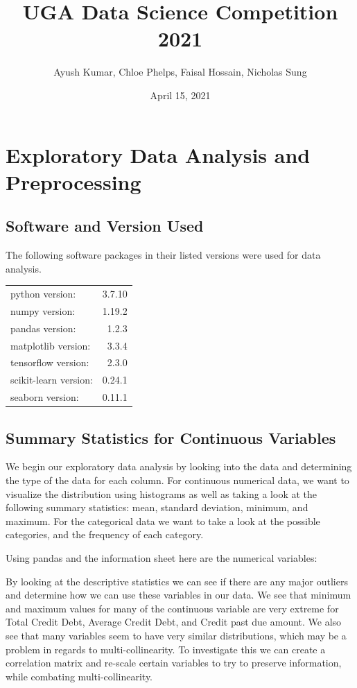 \documentclass[12pt]{article}
\title{UGA Data Science Competition 2021}
\author{Ayush Kumar, Chloe Phelps, Faisal Hossain, Nicholas Sung}
\date{April 15, 2021}
\begin{document}
 
	
	\maketitle
	\tableofcontents
	\newpage
	
	\section{Exploratory Data Analysis and Preprocessing}
	
	\subsection{Software and Version Used}
	The following software packages in their listed versions were used for data analysis. 
	
	\begin{tabular} {l r}
			python version: &	 3.7.10 \\
			numpy version: 	&	 1.19.2 \\
			pandas version: &	 1.2.3 \\
			matplotlib version: &	 3.3.4 \\
			tensorflow version: &	 2.3.0 \\
			scikit-learn version: & 	 0.24.1 \\
			seaborn version: &	 0.11.1 \\
	\end{tabular}
	

	
	\subsection{Summary Statistics for Continuous Variables}
	
	We begin our exploratory data analysis by looking into the data and determining the type of the data for each column. For continuous numerical data, we want to visualize the distribution using histograms as well as taking a look at the following summary statistics: mean, standard deviation, minimum, and maximum. For the categorical data we want to take a look at the possible categories, and the frequency of each category. 
	
	Using pandas and the information sheet here are the numerical variables: 
	

	
	
	By looking at the descriptive statistics we can see if there are any major outliers and determine how we can use these variables in our data. We see that minimum and maximum values for many of the continuous variable are very extreme for Total Credit Debt, Average Credit Debt, and Credit past due amount. We also see that many variables seem to have very similar distributions, which may be a problem in regards to multi-collinearity. To investigate this we can create a correlation matrix and re-scale certain variables to try to preserve information, while combating multi-collinearity. 
	
\end{document}
